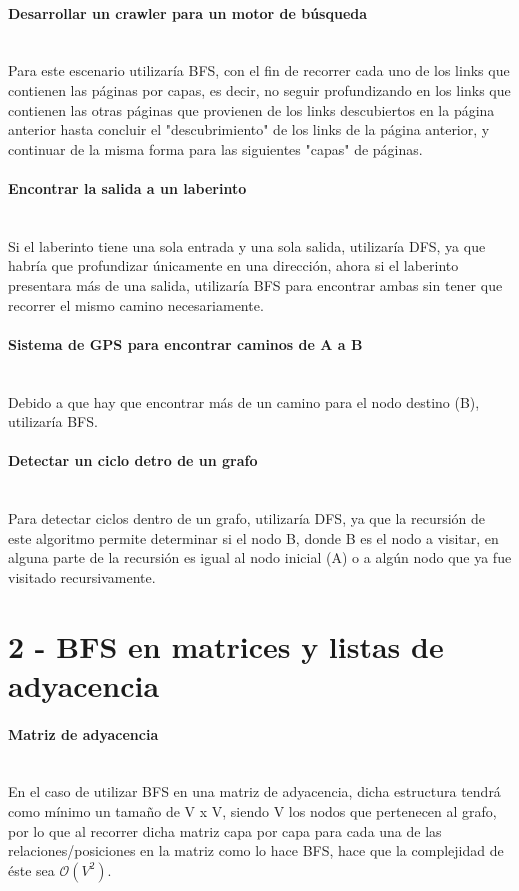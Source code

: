 \documentclass[10pt, letter]{report}
\begin{document}
\paragraph{Desarrollar un crawler para un motor de búsqueda}~\\
Para este escenario utilizaría BFS, con el fin de recorrer cada uno de los links que contienen las páginas por capas, es decir, no seguir profundizando en los links que contienen las otras páginas que provienen de los links descubiertos en la página anterior hasta concluir el "descubrimiento" de los links de la página anterior, y continuar de la misma forma para las siguientes "capas" de páginas.
\paragraph{Encontrar la salida a un laberinto}~\\
Si el laberinto tiene una sola entrada y una sola salida, utilizaría DFS, ya que habría que profundizar únicamente en una dirección, ahora si el laberinto presentara más de una salida, utilizaría BFS para encontrar ambas sin tener que recorrer el mismo camino necesariamente.
\paragraph{Sistema de GPS para encontrar caminos de A a B}~\\
Debido a que hay que encontrar más de un camino para el nodo destino (B), utilizaría BFS.
\paragraph{Detectar un ciclo detro de un grafo}~\\
Para detectar ciclos dentro de un grafo, utilizaría DFS, ya que la recursión de este algoritmo permite determinar si el nodo B, donde B es el nodo a visitar, en alguna parte de la recursión es igual al nodo inicial (A) o a algún nodo que ya fue visitado recursivamente.

\section*{2 - BFS en matrices y listas de adyacencia}
\paragraph{Matriz de adyacencia}~\\
En el caso de utilizar BFS en una matriz de adyacencia, dicha estructura tendrá como mínimo un tamaño de V x V, siendo V los nodos que pertenecen al grafo, por lo que al recorrer dicha matriz capa por capa para cada una de las relaciones/posiciones en la matriz como lo hace BFS, hace que la complejidad de éste sea $\mathcal{O}(V^{2})$.
\end{document}
